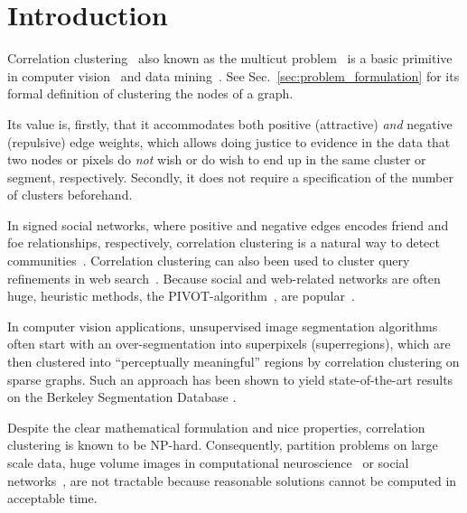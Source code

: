 %
\section{Introduction}
Correlation clustering~\cite{Bansal-2002} also known as the multicut problem~\cite{chopra_1993_mp} 
is a basic primitive in computer vision~\cite{andres_2011_iccv,kroeger_2012_eccv,yarkony_2012_eccv,alush_2013_simbad} and data mining~\cite{Chierichetti-2014,Arasu-2009,Sadikov-2010,Chen-2012}.
See Sec.~\ref{sec:problem_formulation} for its formal definition of clustering the nodes of a graph.
 
Its value is, firstly, that it accommodates both positive (attractive) \emph{and} negative (repulsive) edge weights,
which allows doing justice to evidence in the data that two nodes or pixels do \emph{not} wish  or do wish to end up in the same cluster or segment, respectively.
Secondly, it does not require a specification of the number of clusters beforehand.


In signed social networks, where positive and negative edges encodes friend and foe relationships, respectively,
correlation clustering is a natural way to detect communities~\cite{Chierichetti-2014,Chen-2012}.
Correlation clustering can also been used to cluster query refinements in web search~\cite{Sadikov-2010}.
Because social and web-related networks are often huge, heuristic methods, \eg the PIVOT-algorithm~\cite{Ailon-2008},
are popular~\cite{Chierichetti-2014}.

In computer vision applications, unsupervised image segmentation algorithms often start with an over-segmentation
into superpixels (superregions), which are then clustered into ``perceptually meaningful''
regions by correlation clustering on sparse graphs.
Such an approach has been shown to yield
state-of-the-art results on the Berkeley Segmentation Database
\cite{andres_2011_iccv,Kim-2011,yarkony_2012_eccv,alush_2013_simbad}.

Despite the clear mathematical formulation and nice properties,
correlation clustering is known to be NP-hard. 
%
Consequently, partition problems on large scale data, \eg
huge volume images in computational neuroscience~\cite{kroeger_2012_eccv}
or social networks~\cite{Leskovec-2010}, 
are not tractable because reasonable solutions cannot be computed in acceptable time.


